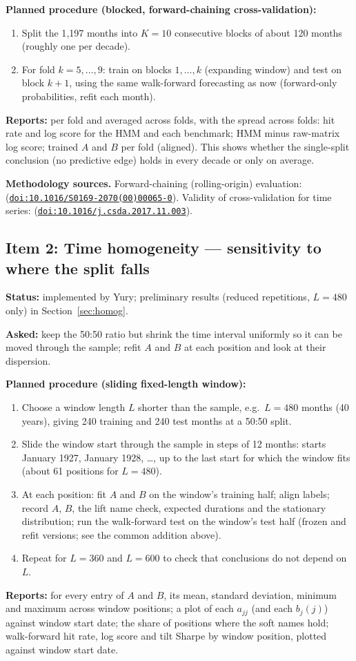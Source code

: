 \documentclass[11pt]{article}
\newcommand{\doi}[1]{\href{https://doi.org/#1}{\nolinkurl{doi:#1}}}
\begin{document}
\textbf{Planned procedure (blocked, forward-chaining cross-validation):}
\begin{enumerate}
\item Split the 1{,}197 months into $K=10$ consecutive blocks of about 120 months (roughly one per decade).
\item For fold $k=5,\dots,9$: train on blocks $1,\dots,k$ (expanding window) and test on block $k+1$, using the same walk-forward forecasting as now (forward-only probabilities, refit each month).
\end{enumerate}
\textbf{Reports:} per fold and averaged across folds, with the spread across folds: hit rate and log score for the HMM and each benchmark; HMM minus raw-matrix log score; trained $A$ and $B$ per fold (aligned). This shows whether the single-split conclusion (no predictive edge) holds in every decade or only on average.

\textbf{Methodology sources.} Forward-chaining (rolling-origin) evaluation: \citet{tashman2000} (\doi{10.1016/S0169-2070(00)00065-0}). Validity of cross-validation for time series: \citet{bergmeir2018} (\doi{10.1016/j.csda.2017.11.003}).

\subsection{Item 2: Time homogeneity --- sensitivity to where the split falls}
\textbf{Status:} implemented by Yury; preliminary results (reduced repetitions, $L=480$ only) in Section~\ref{sec:homog}.

\textbf{Asked:} keep the 50:50 ratio but shrink the time interval uniformly so it can be moved through the sample; refit $A$ and $B$ at each position and look at their dispersion.

\textbf{Planned procedure (sliding fixed-length window):}
\begin{enumerate}
\item Choose a window length $L$ shorter than the sample, e.g.\ $L=480$ months (40 years), giving 240 training and 240 test months at a 50:50 split.
\item Slide the window start through the sample in steps of 12 months: starts January 1927, January 1928, \dots, up to the last start for which the window fits (about 61 positions for $L=480$).
\item At each position: fit $A$ and $B$ on the window's training half; align labels; record $A$, $B$, the lift name check, expected durations and the stationary distribution; run the walk-forward test on the window's test half (frozen and refit versions; see the common addition above).
\item Repeat for $L=360$ and $L=600$ to check that conclusions do not depend on $L$.
\end{enumerate}
\textbf{Reports:} for every entry of $A$ and $B$, its mean, standard deviation, minimum and maximum across window positions; a plot of each $a_{jj}$ (and each $b_j(j)$) against window start date; the share of positions where the soft names hold; walk-forward hit rate, log score and tilt Sharpe by window position, plotted against window start date.
\end{document}
